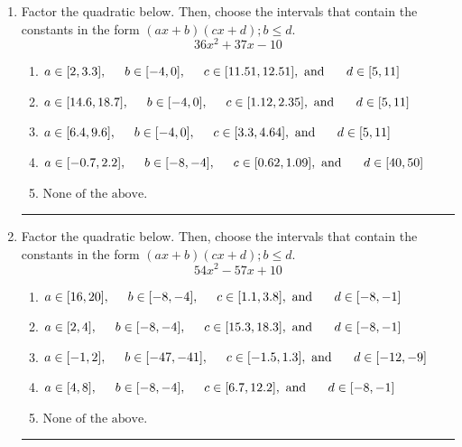 \documentclass[14pt]{extbook}
\newcommand{\litem}[1]{\item#1\hspace*{-1cm}\rule{\textwidth}{0.4pt}}
\begin{document}
\begin{enumerate}
{\begin{enumerate}[label=\Alph*.]
\end{enumerate} }
\litem{
Factor the quadratic below. Then, choose the intervals that contain the constants in the form $(ax+b)(cx+d); b \leq d.$\[ 36x^{2} +37 x -10 \]\begin{enumerate}[label=\Alph*.]
\item \( a \in [2, 3.3], \hspace*{5mm} b \in [-4, 0], \hspace*{5mm} c \in [11.51, 12.51], \text{ and } \hspace*{5mm} d \in [5, 11] \)
\item \( a \in [14.6, 18.7], \hspace*{5mm} b \in [-4, 0], \hspace*{5mm} c \in [1.12, 2.35], \text{ and } \hspace*{5mm} d \in [5, 11] \)
\item \( a \in [6.4, 9.6], \hspace*{5mm} b \in [-4, 0], \hspace*{5mm} c \in [3.3, 4.64], \text{ and } \hspace*{5mm} d \in [5, 11] \)
\item \( a \in [-0.7, 2.2], \hspace*{5mm} b \in [-8, -4], \hspace*{5mm} c \in [0.62, 1.09], \text{ and } \hspace*{5mm} d \in [40, 50] \)
\item \( \text{None of the above.} \)

\end{enumerate} }
\litem{
Factor the quadratic below. Then, choose the intervals that contain the constants in the form $(ax+b)(cx+d); b \leq d.$\[ 54x^{2} -57 x + 10 \]\begin{enumerate}[label=\Alph*.]
\item \( a \in [16, 20], \hspace*{5mm} b \in [-8, -4], \hspace*{5mm} c \in [1.1, 3.8], \text{ and } \hspace*{5mm} d \in [-8, -1] \)
\item \( a \in [2, 4], \hspace*{5mm} b \in [-8, -4], \hspace*{5mm} c \in [15.3, 18.3], \text{ and } \hspace*{5mm} d \in [-8, -1] \)
\item \( a \in [-1, 2], \hspace*{5mm} b \in [-47, -41], \hspace*{5mm} c \in [-1.5, 1.3], \text{ and } \hspace*{5mm} d \in [-12, -9] \)
\item \( a \in [4, 8], \hspace*{5mm} b \in [-8, -4], \hspace*{5mm} c \in [6.7, 12.2], \text{ and } \hspace*{5mm} d \in [-8, -1] \)
\item \( \text{None of the above.} \)


\end{enumerate}}
\end{enumerate}
\end{document}
